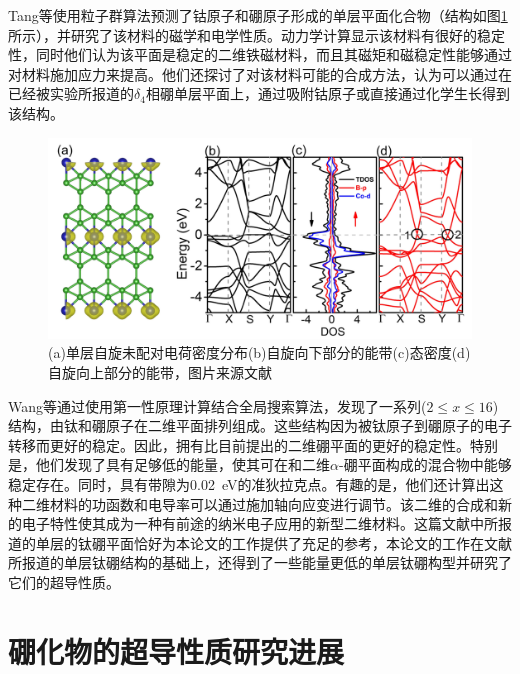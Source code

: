 Tang等\cite{tang2019cob}使用粒子群算法预测了钴原子和硼原子形成的单层平面化合物（结构如图\ref{fig:ch1_cob6}所示），并研究了该材料的磁学和电学性质。动力学计算显示该材料有很好的稳定性，同时他们认为该平面是稳定的二维铁磁材料，而且其磁矩和磁稳定性能够通过对材料施加应力来提高。他们还探讨了对该材料可能的合成方法，认为可以通过在已经被实验所报道的$\delta_4$相硼单层平面上，通过吸附钴原子或直接通过化学生长得到该结构。

\begin{figure}[bt]
  \includegraphics[width=1.0\textwidth]{figs/ch1_cob6.png}
  \centering
  \caption{(a)单层自旋未配对电荷密度分布(b)自旋向下部分的能带(c)态密度(d)自旋向上部分的能带，图片来源文献\cite{tang2019cob}}
  \label{fig:ch1_cob6}
\end{figure}

Wang等\cite{wang2017semimetallic}通过使用第一性原理计算结合全局搜索算法，发现了一系列($2\leq x\leq 16$)结构，由钛和硼原子在二维平面排列组成。这些结构因为被钛原子到硼原子的电子转移而更好的稳定。因此，拥有比目前提出的二维硼平面的更好的稳定性。特别是，他们发现了具有足够低的能量，使其可在和二维$\alpha$-硼平面构成的混合物中能够稳定存在。同时，具有带隙为\SI{0.02}{\eV}的准狄拉克点。有趣的是，他们还计算出这种二维材料的功函数和电导率可以通过施加轴向应变进行调节。该二维的合成和新的电子特性使其成为一种有前途的纳米电子应用的新型二维材料。这篇文献中所报道的单层的钛硼平面恰好为本论文的工作提供了充足的参考，本论文的工作在文献所报道的单层钛硼结构的基础上，还得到了一些能量更低的单层钛硼构型并研究了它们的超导性质。


\section{硼化物的超导性质研究进展}

